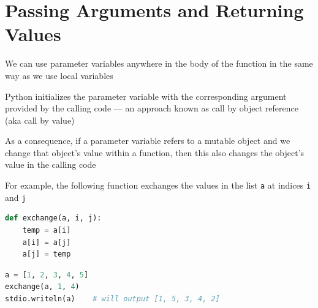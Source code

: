 \documentclass[8pt,a4paper,compress]{beamer}
\begin{document}
\section{Passing Arguments and Returning Values}
\begin{frame}[fragile]
\pause

We can use parameter variables anywhere in the body of the function in the same way as we use local variables

\pause
\bigskip

Python initializes the parameter variable with the corresponding argument provided by the calling code --- an approach known as call by object reference (aka call by value)

\pause
\bigskip

As a consequence, if a parameter variable refers to a mutable object and we change that object's value within a function, then this also changes the object's value in the calling code

\pause
\bigskip

For example, the following function exchanges the values in the list \lstinline{a} at indices \lstinline{i} and \lstinline{j}

\smallskip

\begin{lstlisting}[language=Python,style=focusin]
def exchange(a, i, j):
    temp = a[i]
    a[i] = a[j]
    a[j] = temp
\end{lstlisting}

\smallskip

\begin{lstlisting}[language=Python,style=focusin]
a = [1, 2, 3, 4, 5]
exchange(a, 1, 4) 
stdio.writeln(a)    # will output [1, 5, 3, 4, 2]
\end{lstlisting}
\end{frame}
\end{document}

